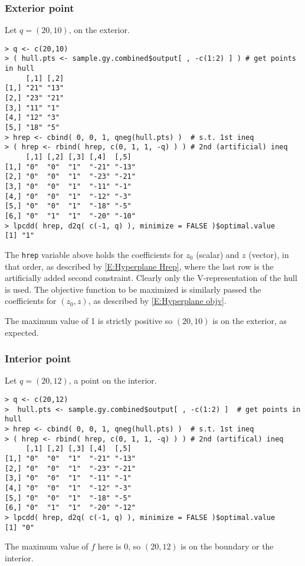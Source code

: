 \subsubsection{Exterior point}
Let $q = (20,10)$, on the exterior.
\begin{verbatim}
> q <- c(20,10) 
> ( hull.pts <- sample.gy.combined$output[ , -c(1:2) ] ) # get points in hull
     [,1] [,2]
[1,] "21" "13"
[2,] "23" "21"
[3,] "11" "1" 
[4,] "12" "3" 
[5,] "18" "5" 
> hrep <- cbind( 0, 0, 1, qneg(hull.pts) )	# s.t. 1st ineq
> ( hrep <- rbind( hrep, c(0, 1, 1, -q) ) )	# 2nd (artificial) ineq
     [,1] [,2] [,3] [,4]  [,5] 
[1,] "0"  "0"  "1"  "-21" "-13"
[2,] "0"  "0"  "1"  "-23" "-21"
[3,] "0"  "0"  "1"  "-11" "-1" 
[4,] "0"  "0"  "1"  "-12" "-3" 
[5,] "0"  "0"  "1"  "-18" "-5" 
[6,] "0"  "1"  "1"  "-20" "-10"
> lpcdd( hrep, d2q( c(-1, q) ), minimize = FALSE )$optimal.value
[1] "1"
\end{verbatim}
The \texttt{hrep} variable above holds the coefficients for $z_0$ (scalar) and $z$ (vector), 
in that order, as described by \eqref{E:Hyperplane Hrep}, where the last row 
is the artificially added second constraint.  Clearly only the V-representation of the
 hull is used.
The objective function to be maximized is similarly passed the coefficients for $(z_0, z)$,
as described by \eqref{E:Hyperplane objv}.

The maximum value of 1 is strictly positive so $(20,10)$ is on the exterior, as expected.
\subsubsection{Interior point}
Let $q = (20,12)$, a point on the interior.
\begin{verbatim}
> q <- c(20,12) 
>  hull.pts <- sample.gy.combined$output[ , -c(1:2) ]  # get points in hull
> hrep <- cbind( 0, 0, 1, qneg(hull.pts) )	# s.t. 1st ineq
> ( hrep <- rbind( hrep, c(0, 1, 1, -q) ) )	# 2nd (artifical) ineq
     [,1] [,2] [,3] [,4]  [,5] 
[1,] "0"  "0"  "1"  "-21" "-13"
[2,] "0"  "0"  "1"  "-23" "-21"
[3,] "0"  "0"  "1"  "-11" "-1" 
[4,] "0"  "0"  "1"  "-12" "-3" 
[5,] "0"  "0"  "1"  "-18" "-5" 
[6,] "0"  "1"  "1"  "-20" "-12"
> lpcdd( hrep, d2q( c(-1, q) ), minimize = FALSE )$optimal.value
[1] "0"
\end{verbatim}
The maximum value of $f$ here is 0, so $(20,12)$ is on the boundary or the interior.
